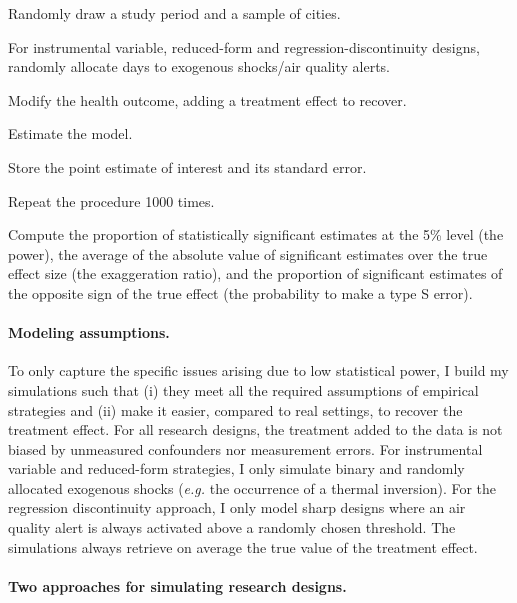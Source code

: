 \documentclass[12pt]{article}
\begin{document}
        \begin{sloppypar}
        \begin{senumerate}
            \item Randomly draw a study period and a sample of cities.
            \item For instrumental variable, reduced-form and regression-discontinuity designs, randomly allocate days to exogenous shocks/air quality alerts.
            \item Modify the health outcome, adding a treatment effect to recover.
            \item Estimate the model.
            \item Store the point estimate of interest and its standard error.
            \item Repeat the procedure 1000 times.
            \item Compute the proportion of statistically significant estimates at the 5\% level (the power), the average of the absolute value of significant estimates over the true effect size (the exaggeration ratio), and the proportion of significant estimates of the opposite sign of the true effect (the probability to make a type S error). 
        \end{senumerate}
        \end{sloppypar}
        
        \paragraph{Modeling assumptions.} To only capture the specific issues arising due to low statistical power, I build my simulations such that (i) they meet all the required assumptions of empirical strategies and (ii) make it easier, compared to real settings, to recover the treatment effect. For all research designs, the treatment added to the data is not biased by unmeasured confounders nor measurement errors. For instrumental variable and reduced-form strategies, I only simulate binary and randomly allocated exogenous shocks (\textit{e.g.} the occurrence of a thermal inversion). For the regression discontinuity approach, I only model sharp designs where an air quality alert is always activated above a randomly chosen threshold. The simulations always retrieve on average the true value of the treatment effect.
     
        \paragraph{Two approaches for simulating research designs.}
\end{document}
